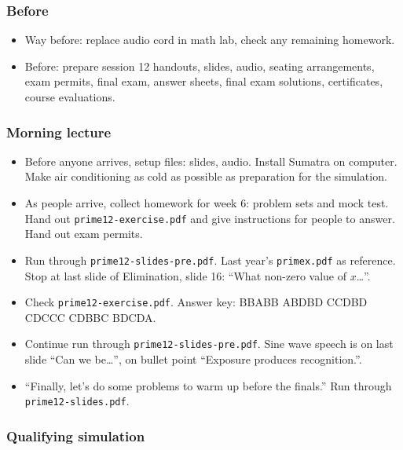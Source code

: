 \documentclass[10pt,paper=letter]{scrartcl}
\begin{document}
\subsubsection*{Before}

\begin{itemize}
  \item Way before: replace audio cord in math lab, check any remaining homework.
  \item Before: prepare session 12 handouts, slides, audio, seating arrangements, exam permits, final exam, answer sheets, final exam solutions, certificates, course evaluations.
\end{itemize}

\subsubsection*{Morning lecture}

\begin{itemize}
  \item Before anyone arrives, setup files: slides, audio. Install Sumatra on computer. Make air conditioning as cold as possible as preparation for the simulation.
  \item As people arrive, collect homework for week $6$: problem sets and mock test. Hand out \verb+prime12-exercise.pdf+ and give instructions for people to answer. Hand out exam permits.
  \item Run through \verb+prime12-slides-pre.pdf+. Last year's \verb+primex.pdf+ as reference. Stop at last slide of Elimination, slide 16: ``What non-zero value of $x$\dots''.
  \item Check \verb+prime12-exercise.pdf+. Answer key: BBABB ABDBD CCDBD CDCCC CDBBC BDCDA.
  \item Continue run through \verb+prime12-slides-pre.pdf+. Sine wave speech is on last slide ``Can we be\dots'', on bullet point ``Exposure produces recognition.''.
  \item ``Finally, let's do some problems to warm up before the finals.'' Run through \verb+prime12-slides.pdf+.
\end{itemize}

\subsubsection*{Qualifying simulation}
\end{document}
